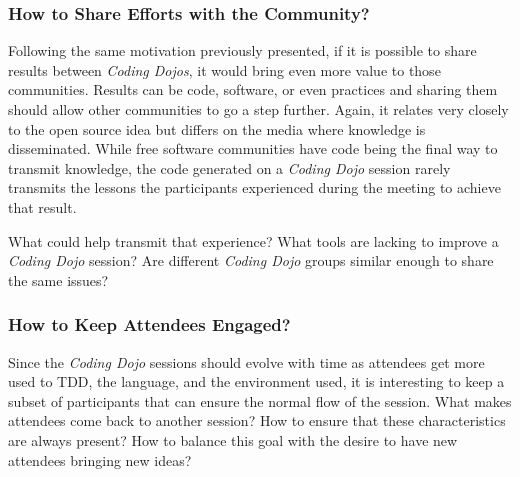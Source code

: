 \subsubsection{How to Share Efforts with the Community?}

Following the same motivation previously presented, if it is possible
to share results between \emph{Coding Dojos}, it would bring even
more value to those communities. Results can be code, software, or
even practices and sharing them should allow other communities to go a
step further. Again, it relates very closely to the open source
idea but differs on the media where knowledge is disseminated. While
free software communities have code being the final way to transmit
knowledge, the code generated on a \emph{Coding Dojo} session rarely
transmits the lessons the participants experienced during the meeting
to achieve that result.

What could help transmit that experience? What tools are lacking to
improve a \emph{Coding Dojo} session? Are different \emph{Coding Dojo}
groups similar enough to share the same issues?

\subsubsection{How to Keep Attendees Engaged?}

Since the \textit{Coding Dojo} sessions should evolve with time as
attendees get more used to TDD, the language, and the environment used,
it is interesting to keep a subset of participants that can ensure the
normal flow of the session. What makes attendees come back to another
session? How to ensure that these characteristics are always present?
How to balance this goal with the desire to have new attendees bringing
new ideas?